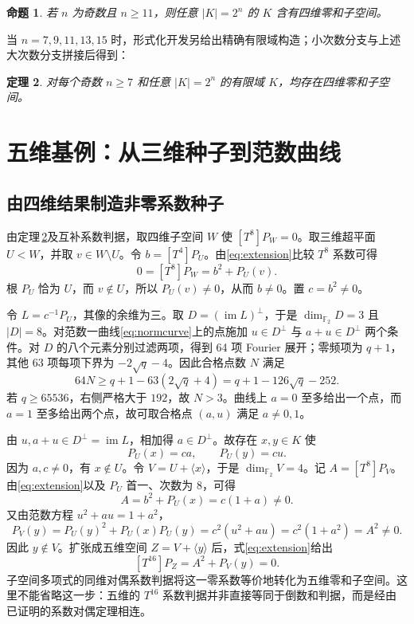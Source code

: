 \documentclass[UTF8,a4paper,11pt]{ctexart}
\numberwithin{equation}{section}
\newtheorem{theorem}{定理}[section]
\newtheorem{proposition}[theorem]{命题}
\theoremstyle{definition}
\theoremstyle{remark}
\newcommand{\Ftwo}{\mathbb F_2}
\newcommand{\dimf}{\dim_{\Ftwo}}
\begin{document}
\begin{proposition}\label{prop:k4large}
若 $n$ 为奇数且 $n\ge11$，则任意 $|K|=2^n$ 的 $K$ 含有四维零和子空间。
\end{proposition}

当 $n=7,9,11,13,15$ 时，形式化开发另给出精确有限域构造；小次数分支与上述大次数分支拼接后得到：
\begin{theorem}\label{thm:k4}
对每个奇数 $n\ge7$ 和任意 $|K|=2^n$ 的有限域 $K$，均存在四维零和子空间。
\end{theorem}

\section{五维基例：从三维种子到范数曲线}

\subsection{由四维结果制造非零系数种子}

由定理\,\ref{thm:k4}及互补系数判据，取四维子空间 $W$ 使 $[T^8]P_W=0$。取三维超平面 $U<W$，并取 $v\in W\setminus U$。令 $b=[T^4]P_U$。由\eqref{eq:extension}比较 $T^8$ 系数可得
\[
 0=[T^8]P_W=b^2+P_U(v).
\]
根 $P_U$ 恰为 $U$，而 $v\notin U$，所以 $P_U(v)\ne0$，从而 $b\ne0$。置 $c=b^2\ne0$。

令 $L=c^{-1}P_U$，其像的余维为三。取 $D=(\operatorname{im}L)^\perp$，于是 $\dimf D=3$ 且 $|D|=8$。对范数一曲线\eqref{eq:normcurve}上的点施加 $u\in D^\perp$ 与 $a+u\in D^\perp$ 两个条件。对 $D$ 的八个元素分别过滤两项，得到 64 项 Fourier 展开；零频项为 $q+1$，其他 63 项每项下界为 $-2\sqrt q-4$。因此合格点数 $N$ 满足
\begin{equation}\label{eq:k5count}
 64N\ge q+1-63(2\sqrt q+4)=q+1-126\sqrt q-252.
\end{equation}
若 $q\ge65536$，右侧严格大于 $192$，故 $N>3$。曲线上 $a=0$ 至多给出一个点，而 $a=1$ 至多给出两个点，故可取合格点 $(a,u)$ 满足 $a\ne0,1$。

由 $u,a+u\in D^\perp=\operatorname{im}L$，相加得 $a\in D^\perp$。故存在 $x,y\in K$ 使
\[
 P_U(x)=ca,\qquad P_U(y)=cu.
\]
因为 $a,c\ne0$，有 $x\notin U$。令 $V=U+\langle x\rangle$，于是 $\dimf V=4$。记 $A=[T^8]P_V$。由\eqref{eq:extension}以及 $P_U$ 首一、次数为 $8$，可得
\[
 A=b^2+P_U(x)=c(1+a)\ne0.
\]
又由范数方程 $u^2+au=1+a^2$，
\[
 P_V(y)=P_U(y)^2+P_U(x)P_U(y)
       =c^2(u^2+au)=c^2(1+a^2)=A^2\ne0.
\]
因此 $y\notin V$。扩张成五维空间 $Z=V+\langle y\rangle$ 后，式\eqref{eq:extension}给出
\[
 [T^{16}]P_Z=A^2+P_V(y)=0.
\]
子空间多项式的同维对偶系数判据将这一零系数等价地转化为五维零和子空间。这里不能省略这一步：五维的 $T^{16}$ 系数判据并非直接等同于倒数和判据，而是经由已证明的系数对偶定理相连。
\end{document}

